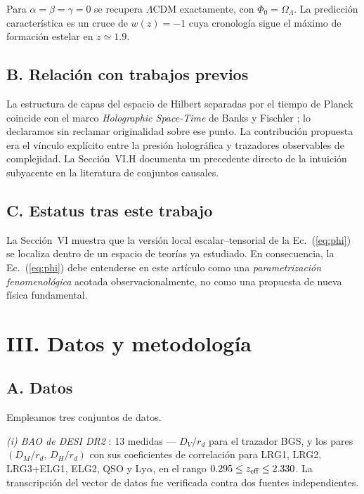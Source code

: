 \documentclass[aps,prd,twocolumn,superscriptaddress,nofootinbib,floatfix]{revtex4-2}
\newcommand{\LCDM}{\ensuremath{\Lambda}CDM}
\begin{document}
Para $\alpha=\beta=\gamma=0$ se recupera \LCDM{} exactamente, con
$\Phi_0=\Omega_\Lambda$. La predicci\'on caracter\'istica es un cruce de
$w(z)=-1$ cuya cronolog\'ia sigue el m\'aximo de formaci\'on estelar en
$z\simeq1.9$.

\subsection*{B. Relaci\'on con trabajos previos}

La estructura de capas del espacio de Hilbert separadas por el tiempo
de Planck coincide con el marco \emph{Holographic Space-Time} de Banks
y Fischler \cite{Banks2011}; lo declaramos sin reclamar originalidad
sobre ese punto. La contribuci\'on propuesta era el v\'inculo
expl\'icito entre la presi\'on hologr\'afica y trazadores observables de
complejidad. La Secci\'on~VI.H documenta un precedente directo de la
intuici\'on subyacente en la literatura de conjuntos causales.

\subsection*{C. Estatus tras este trabajo}

La Secci\'on~VI muestra que la versi\'on local escalar--tensorial de la
Ec.~(\ref{eq:phi}) se localiza dentro de un espacio de teor\'ias ya
estudiado. En consecuencia, la Ec.~(\ref{eq:phi}) debe entenderse en
este art\'iculo como una \emph{parametrizaci\'on fenomenol\'ogica}
acotada observacionalmente, no como una propuesta de nueva f\'isica
fundamental.

\section*{III. Datos y metodolog\'ia}

\subsection*{A. Datos}

Empleamos tres conjuntos de datos.

\emph{(i) BAO de DESI DR2} \cite{DESI2025}: 13 medidas --- $D_V/r_d$
para el trazador BGS, y los pares $(D_M/r_d,\,D_H/r_d)$ con sus
coeficientes de correlaci\'on para LRG1, LRG2, LRG3+ELG1, ELG2, QSO y
Ly$\alpha$, en el rango $0.295\le z_{\rm eff}\le2.330$. La
transcripci\'on del vector de datos fue verificada contra dos fuentes
independientes.
\end{document}

